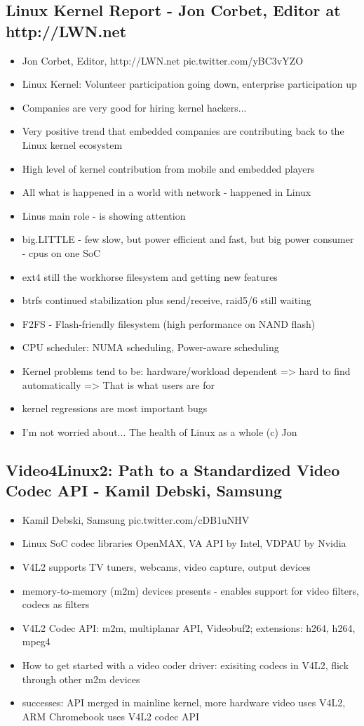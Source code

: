 \documentclass[10pt]{article}
\begin{document}
{\subsection{Linux Kernel Report - Jon Corbet, Editor at http://LWN.net}
\begin{itemize}
\item Jon Corbet, Editor, http://LWN.net  pic.twitter.com/yBC3vYZO
\item Linux Kernel: Volunteer participation going down, enterprise participation up
\item Companies are very good for hiring kernel hackers...
\item Very positive trend that embedded companies are contributing back to the Linux kernel ecosystem
\item High level of kernel contribution from mobile and embedded players
\item All what is happened in a world with network - happened in Linux
\item Linus main role - is showing attention
\item big.LITTLE - few slow, but power efficient and fast, but big power consumer - cpus on one SoC
\item ext4 still the workhorse filesystem and getting new features
\item btrfs continued stabilization plus send/receive, raid5/6 still waiting
\item F2FS - Flash-friendly filesystem (high performance on NAND flash)
\item CPU scheduler: NUMA scheduling, Power-aware scheduling
\item Kernel problems tend to be: hardware/workload dependent => hard to find automatically => That is what users are for
\item kernel regressions are most important bugs
\item I'm not worried about... The health of Linux as a whole (c) Jon
\end{itemize}

\subsection{Video4Linux2: Path to a Standardized Video Codec API - Kamil Debski, Samsung}
\begin{itemize}
\item Kamil Debski, Samsung pic.twitter.com/cDB1uNHV
\item Linux SoC codec libraries OpenMAX, VA API by Intel, VDPAU by Nvidia
\item V4L2 supports TV tuners, webcams, video capture, output devices
\item memory-to-memory (m2m) devices presents - enables support for video filters, codecs as filters
\item V4L2 Codec API: m2m, multiplanar API, Videobuf2; extensions: h264, h264, mpeg4
\item How to get started with a video coder driver: exisiting codecs in V4L2, flick through other m2m devices
\item successes: API merged in mainline kernel, more hardware video uses V4L2, ARM Chromebook uses V4L2 codec API
\end{itemize}

}
\end{document}
